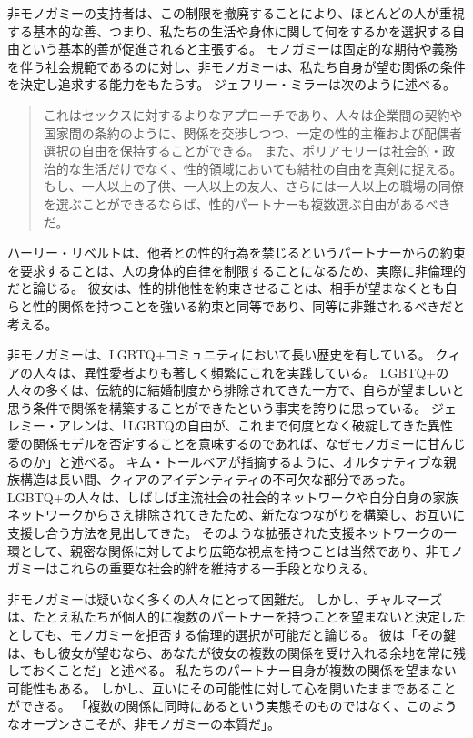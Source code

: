 \documentclass[paper=a4,book,openany]{jlreq}
\newcommand{\ig}[1]{}           %
\begin{document}
非モノガミーの支持者は、この制限を撤廃することにより、ほとんどの人が重視する基本的な善、つまり、私たちの生活や身体に関して何をするかを選択する自由という基本的善が促進されると主張する。
モノガミーは固定的な期待や義務を伴う社会規範であるのに対し、非モノガミーは、私たち自身が望む関係の条件を決定し追求する能力をもたらす。
ジェフリー・ミラー\ig{Geoffrey Miller}は次のように述べる。

\begin{quote}
これはセックスに対するよりなアプローチであり、人々は企業間の契約や国家間の条約のように、関係を交渉しつつ、一定の性的主権および配偶者選択の自由を保持することができる。
また、ポリアモリーは社会的・政治的な生活だけでなく、性的領域においても結社の自由を真剣に捉える。
もし、一人以上の子供、一人以上の友人、さらには一人以上の職場の同僚を選ぶことができるならば、性的パートナーも複数選ぶ自由があるべきだ。
\citep{miller19:_polyam_is_growin}

\end{quote}

ハーリー・リベルトは、他者との性的行為を禁じるというパートナーからの約束を要求することは、人の身体的自律を制限することになるため、実際に非倫理的だと論じる。
彼女は、性的排他性を約束させることは、相手が望まなくとも自らと性的関係を持つことを強いる約束と同等であり、同等に非難されるべきだと考える\citep{liberto17:_prob_sexual_prom}。

非モノガミーは、LGBTQ+コミュニティにおいて長い歴史を有している。
クィアの人々は、異性愛者よりも著しく頻繁にこれを実践している\citep{haupert17:_preval_exper_consen_nonmon_relat}。
LGBTQ+の人々の多くは、伝統的に結婚制度から排除されてきた一方で、自らが望ましいと思う条件で関係を構築することができたという事実を誇りに思っている。
ジェレミー・アレンは、「LGBTQの自由が、これまで何度となく破綻してきた異性愛の関係モデルを否定することを意味するのであれば、なぜモノガミーに甘んじるのか」と述べる\citep{allen20:_his_body_doesn_belon_me}。
キム・トールベアが指摘するように、オルタナティブな親族構造は長い間、クィアのアイデンティティの不可欠な部分であった。
LGBTQ+の人々は、しばしば主流社会の社会的ネットワークや自分自身の家族ネットワークからさえ排除されてきたため、新たなつながりを構築し、お互いに支援し合う方法を見出してきた。
そのような拡張された支援ネットワークの一環として、親密な関係に対してより広範な視点を持つことは当然であり、非モノガミーはこれらの重要な社会的絆を維持する一手段となりえる\citep{podcast18:_episod}。

非モノガミーは疑いなく多くの人々にとって困難だ。
しかし、チャルマーズは、たとえ私たちが個人的に複数のパートナーを持つことを望まないと決定したとしても、モノガミーを拒否する倫理的選択が可能だと論じる。
彼は「その鍵は、もし彼女が望むなら、あなたが彼女の複数の関係を受け入れる余地を常に残しておくことだ」と述べる\citep[p.241]{chalmers19:_is_monog_moral_permis}。
私たちのパートナー自身が複数の関係を望まない可能性もある。
しかし、互いにその可能性に対して心を開いたままであることができる。
「複数の関係に同時にあるという実態そのものではなく、このようなオープンさこそが、非モノガミーの本質だ」\citep[p.241]{chalmers19:_is_monog_moral_permis}。
\end{document}
